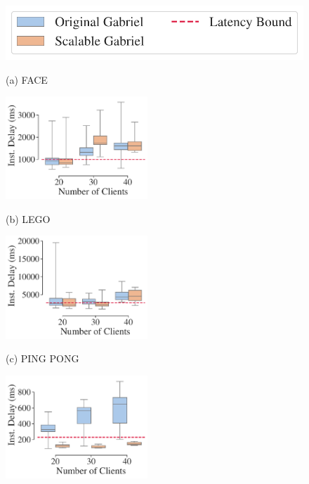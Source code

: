 \begin{figure}
\centering
\includegraphics[width=0.7\linewidth, trim=0em 0em 0em 0em, clip]{FIGS/fig-sec6-latency-legend.pdf} \\
\centering
\begin{turn}{90}{\hspace{0.6in}\small (a) FACE}\end{turn}\hspace{0.2in}\includegraphics[width=2.1in, trim=0em 0em 0em 0em, clip]{FIGS/fig-sec6-latency-face.pdf}\\[0.08in]
\begin{turn}{90}{\hspace{0.6in}\small (b) LEGO}\end{turn}\hspace{0.2in}\includegraphics[width=2.1in, trim=0em 0em 0em 0em, clip]{FIGS/fig-sec6-latency-lego.pdf}\\[0.08in]
\begin{turn}{90}{\hspace{0.6in}\small (c) PING PONG}\end{turn}\hspace{0.2in}\includegraphics[width=2.1in, trim=0em 0em 0em 0em, clip]{FIGS/fig-sec6-latency-pingpong.pdf}\\[0.08in]

\end{figure}
